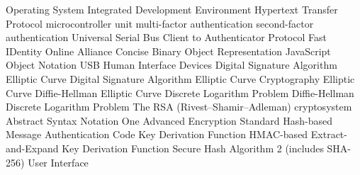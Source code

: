       {Operating System}
     {Integrated Development Environment}
    {Hypertext Transfer Protocol}
     {microcontroller unit}
     {multi-factor authentication}
     {second-factor authentication}
     {Universal Serial Bus}
    {Client to Authenticator Protocol}
    {Fast IDentity Online Alliance}
    {Concise Binary Object Representation}
    {JavaScript Object Notation}
     {USB Human Interface Devices}
     {Digital Signature Algorithm}
   {Elliptic Curve Digital Signature Algorithm}
     {Elliptic Curve Cryptography}
    {Elliptic Curve Diffie-Hellman}
   {Elliptic Curve Discrete Logarithm Problem}
      {Diffie-Hellman}
     {Discrete Logarithm Problem}
     {The RSA (Rivest–Shamir–Adleman) cryptosystem}
   {Abstract Syntax Notation One}
     {Advanced Encryption Standard}
    {Hash-based Message Authentication Code}
     {Key Derivation Function}
    {HMAC-based Extract-and-Expand Key Derivation Function}
   {Secure Hash Algorithm 2 (includes SHA-256)}
      {User Interface}
